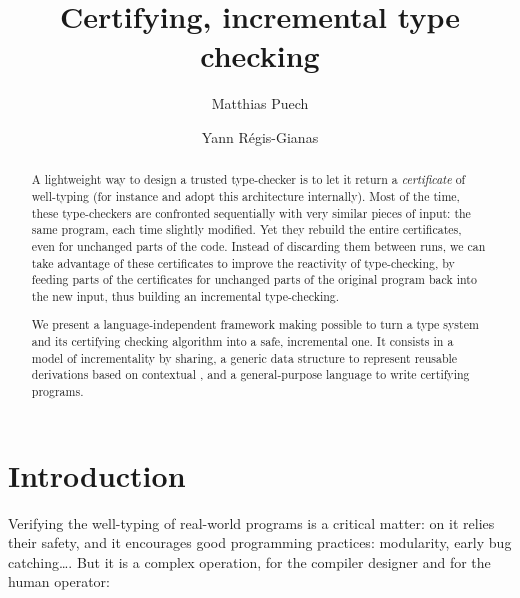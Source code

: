 \documentclass{llncs}
\begin{document}
\title{Certifying, incremental type checking}

\author{Matthias Puech \and Yann R\'egis-Gianas}

\maketitle

\begin{abstract}

  A lightweight way to design a trusted type-checker is to let it
  return a \emph{certificate} of well-typing (for instance
   and  adopt this architecture
  internally).  Most of the time, these type-checkers are confronted
  sequentially with very similar pieces of input: the same program,
  each time slightly modified. Yet they rebuild the entire
  certificates, even for unchanged parts of the code. Instead of
  discarding them between runs, we can take advantage of these
  certificates to improve the reactivity of type-checking, by feeding
  parts of the certificates for unchanged parts of the original
  program back into the new input, thus building an incremental
  type-checking.

  We present a language-independent framework making possible to turn
  a type system and its certifying checking algorithm into a safe,
  incremental one. It consists in a model of incrementality by
  sharing, a generic data structure to represent reusable derivations
  based on contextual \LF, and a general-purpose language to write
  certifying programs.
\end{abstract}


\section*{Introduction}


Verifying the well-typing of real-world programs is a critical matter:
on it relies their safety, and it encourages good programming
practices: modularity, early bug catching\ldots. But it is a complex
operation, for the compiler designer and for the human operator:
\end{document}
